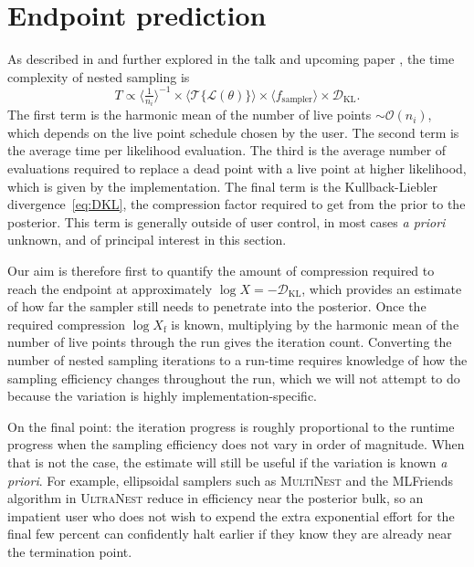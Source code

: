 \documentclass[usenatbib]{mnras}
\newcommand{\nlive}{n_i}
\newcommand{\Like}{\mathcal{L}}
\newcommand{\DKL}{\mathcal{D}_\mathrm{KL}}
\begin{document}
\section{Endpoint prediction}\label{sec:endpoint}
As described in \citet{supernest} and further explored in the talk and upcoming paper \citet{kcl_talk, scaling_frontier}, the time complexity of nested sampling is
\begin{equation}
    T \propto \langle \tfrac{1}{\nlive} \rangle^{-1} \times \langle \mathcal{T}\{ \Like(\theta) \} \rangle \times \langle f_\mathrm{sampler} \rangle \times \DKL.
\end{equation}
The first term is the harmonic mean of the number of live points $\sim\mathcal{O}(n_i)$, which depends on the live point schedule chosen by the user. The second term is the average time per likelihood evaluation. The third is the average number of evaluations required to replace a dead point with a live point at higher likelihood, which is given by the implementation. The final term is the Kullback-Liebler divergence~\cref{eq:DKL}, the compression factor required to get from the prior to the posterior. This term is generally outside of user control, in most cases \textit{a priori} unknown, and of principal interest in this section.
\par
Our aim is therefore first to quantify the amount of compression required to reach the endpoint at approximately $\log X = -\DKL$, which provides an estimate of how far the sampler still needs to penetrate into the posterior. Once the required compression $\log X_\mathrm{f}$ is known, multiplying by the harmonic mean of the number of live points through the run gives the iteration count. Converting the number of nested sampling iterations to a run-time requires knowledge of how the sampling efficiency changes throughout the run, which we will not attempt to do because the variation is highly implementation-specific. 
\par
On the final point: the iteration progress is roughly proportional to the runtime progress when the sampling efficiency does not vary in order of magnitude. When that is not the case, the estimate will still be useful if the variation is known \textit{a priori}. For example, ellipsoidal samplers such as \textsc{MultiNest} and the MLFriends algorithm in \textsc{UltraNest} reduce in efficiency near the posterior bulk, so an impatient user who does not wish to expend the extra exponential effort for the final few percent can confidently halt earlier if they know they are already near the termination point.
\end{document}

